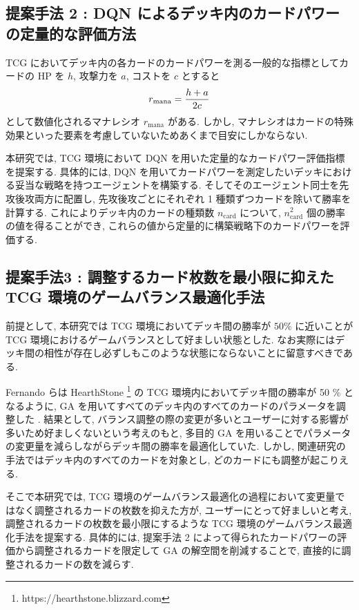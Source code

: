 \documentclass[twocolumn]{jarticle}     %
\begin{document}
\subsection{提案手法 2 : DQN によるデッキ内のカードパワーの定量的な評価方法}
\label{manaratio}
TCG においてデッキ内の各カードのカードパワーを測る一般的な指標としてカードの HP を $h$, 攻撃力を $a$, コストを $c$ とすると
\begin{equation*}
   \small
   r_\mathrm{mana} = \frac{h+a}{2c}
\end{equation*}
として数値化されるマナレシオ $r_\mathrm{mana}$ がある. 
しかし, マナレシオはカードの特殊効果といった要素を考慮していないためあくまで目安にしかならない. \par
本研究では, TCG 環境において DQN を用いた定量的なカードパワー評価指標を提案する.
具体的には, DQN を用いてカードパワーを測定したいデッキにおける妥当な戦略を持つエージェントを構築する. 
そしてそのエージェント同士を先攻後攻両方に配置し, 先攻後攻ごとにそれぞれ 1 種類ずつカードを除いて勝率を計算する. これによりデッキ内のカードの種類数 $n_{\mathrm{card}}$ について, $n_{\mathrm{card}}^2$ 個の勝率の値を得ることができ, これらの値から定量的に構築戦略下のカードパワーを評価する. 

\subsection{提案手法3 : 調整するカード枚数を最小限に抑えた TCG 環境のゲームバランス最適化手法}
\label{hearthstone}
前提として, 本研究では TCG 環境においてデッキ間の勝率が $50\%$ に近いことが TCG 環境におけるゲームバランスとして好ましい状態とした. なお実際にはデッキ間の相性が存在し必ずしもこのような状態にならないことに留意すべきである.
\par
Fernando らは HearthStone \footnote[2]{https://hearthstone.blizzard.com} の TCG 環境内においてデッキ間の勝率が 50 \% となるように, GA を用いてすべてのデッキ内のすべてのカードのパラメータを調整した \cite{Hearthstone}.
結果として, バランス調整の際の変更が多いとユーザーに対する影響が多いため好ましくないという考えのもと, 多目的 GA を用いることでパラメータの変更量を減らしながらデッキ間の勝率を最適化していた.
しかし, 関連研究の手法ではデッキ内のすべてのカードを対象とし, どのカードにも調整が起こりえる.
\par
そこで本研究では, TCG 環境のゲームバランス最適化の過程において変更量ではなく調整されるカードの枚数を抑えた方が, ユーザーにとって好ましいと考え, 調整されるカードの枚数を最小限にするような TCG 環境のゲームバランス最適化手法を提案する.
具体的には, 提案手法 2 によって得られたカードパワーの評価から調整されるカードを限定して GA の解空間を削減することで, 直接的に調整されるカードの数を減らす.
\vspace{-0.20cm}
\end{document}
